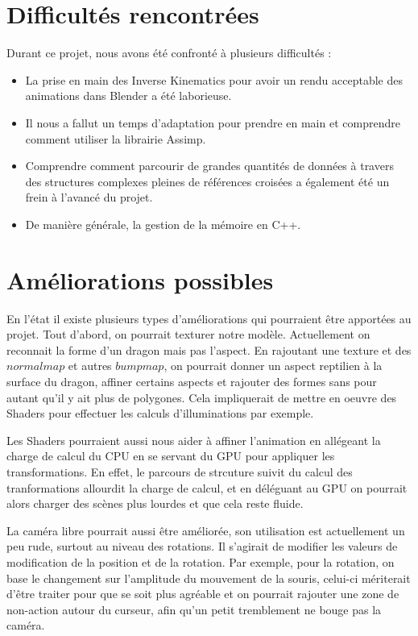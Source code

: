\documentclass[a4paper]{report}
\begin{document}
\section{Difficultés rencontrées}
\par
Durant ce projet, nous avons été confronté à plusieurs difficultés :
\begin{itemize}
\item La prise en main des Inverse Kinematics pour avoir un rendu acceptable des animations dans Blender a été laborieuse.
\item Il nous a fallut un temps d'adaptation pour prendre en main et comprendre comment utiliser la librairie Assimp.
\item Comprendre comment parcourir de grandes quantités de données à travers des structures complexes pleines de références croisées a également été un frein à l'avancé du projet.
\item De manière générale, la gestion de la mémoire en C++.
\end{itemize}
\section{Améliorations possibles}
\par
En l'état il existe plusieurs types d'améliorations qui pourraient être apportées au projet. Tout d'abord, on pourrait texturer notre modèle. Actuellement on reconnait la forme d'un dragon mais pas l'aspect. En rajoutant une texture et des $normal map$ et autres $bump map$, on pourrait donner un aspect reptilien à la surface du dragon, affiner certains aspects et rajouter des formes sans pour autant qu'il y ait plus de polygones. Cela impliquerait de mettre en oeuvre des Shaders pour effectuer les calculs d'illuminations par exemple. 

Les Shaders pourraient aussi nous aider à affiner l'animation en allégeant la charge de calcul du CPU en se servant du GPU pour appliquer les transformations. En effet, le parcours de strcuture suivit du calcul des tranformations allourdit la charge de calcul, et en déléguant au GPU on pourrait alors charger des scènes plus lourdes et que cela reste fluide. 

La caméra libre pourrait aussi être améliorée, son utilisation est actuellement un peu rude, surtout au niveau des rotations. Il s'agirait de modifier les valeurs de modification de la position et de la rotation. Par exemple, pour la rotation, on base le changement sur l'amplitude du mouvement de la souris, celui-ci mériterait d'être traiter pour que se soit plus agréable et on pourrait rajouter une zone de non-action autour du curseur, afin qu'un petit tremblement ne bouge pas la caméra.
\end{document}
